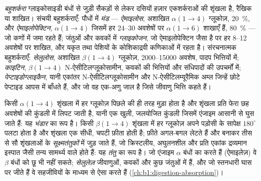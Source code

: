 \begin{definition}[बहुशर्करा]\label{def:b1:carbohydrates:polysaccharide}
\emph{बहुशर्करा} ग्लाइकोसाइडी बंधों से जुड़ी सैकड़ों से
लेकर दसियों हज़ार एकशर्कराओं की शृंखला है, रैखिक या शाखित।
संचयी बहुशर्कराएँ: पौधों में \emph{मंड} ---
\emph{ऐमाइलोस}, अशाखित $\alpha(1{\to}4)$ ग्लूकोज़,
\qty{20}{\%}, और \emph{ऐमाइलोपेक्टिन}, $\alpha(1{\to}4)$ जिसमें हर
\qtyrange{24}{30}{} अवशेषों पर $\alpha(1{\to}6)$ शाखाएँ हैं,
\qty{80}{\%} --- जो कणों में जमा रहते हैं; जंतुओं और कवकों में
\emph{ग्लाइकोजन}, जो ऐमाइलोपेक्टिन जैसा है पर हर
\qtyrange{8}{12}{} अवशेषों पर शाखित, और यकृत तथा पेशियों के कोशिकाद्रवी
कणिकाओं में रहता है। संरचनात्मक बहुशर्कराएँ:
\emph{सेलुलोस}, अशाखित $\beta(1{\to}4)$ ग्लूकोज़,
\qtyrange{2000}{15000}{} अवशेष, पादप भित्तियों में;
\emph{काइटिन}, $\beta(1{\to}4)$
N-ऐसीटिलग्लूकोसामीन, कवकों की भित्तियों और संधिपादों की उपचर्मों में;
\emph{पेप्टाइडोग्लाइकैन}, यानी एकांतर
N-ऐसीटिलग्लूकोसामीन और N-ऐसीटिलम्यूरैमिक अम्ल जिन्हें छोटे पेप्टाइड आपस
में बाँधते हैं, और जो वह एक-अणु जाल है जिसे जीवाणु भित्ति कहते हैं।
\end{definition}

\begin{proposition}[बंध आकृति तय करता है, और आकृति कार्य]\label{prop:b1:carbohydrates:alphabeta}
किसी $\alpha(1{\to}4)$ शृंखला में हर ग्लूकोज़ पिछले की ही तरह मुड़ा होता
है और शृंखला प्रति फेरा छह अवशेषों की कुंडली में लिपट जाती है, यानी एक
खुली, जलयोजित कुंडली जिसमें एंजाइम आसानी से घुस जाते हैं: यह
\emph{भंडार} का रूप है। किसी $\beta(1{\to}4)$ शृंखला में हर ग्लूकोज़ अपने
पड़ोसी के सापेक्ष $180^\circ$ पलटा होता है और शृंखला एक सीधी,
चपटी फ़ीता होती है; फ़ीते अगल-बगल लेटते हैं और  बनाकर तीस से
सौ शृंखलाओं के \emph{सूक्ष्मतंतुकों} में जुड़ जाते हैं, जो क्रिस्टलीय,
अघुलनशील और प्रति एकांक द्रव्यमान इस्पात जैसी तन्य सामर्थ्य वाले होते
हैं: यह \emph{तंतु} का रूप है। जो एंजाइम $\alpha$ बंधों का  करते
हैं (ऐमाइलेज़) वे $\beta$ बंधों को छू भी नहीं सकते;
\emph{सेलुलेज़} जीवाणुओं, कवकों और कुछ जंतुओं में हैं, और जो स्तनधारी
घास पर जीते हैं वे सहजीवियों के माध्यम से ऐसा करते हैं
(\cref{ch:b1:digestion-absorption})।
\end{proposition}

